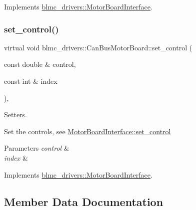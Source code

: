 Implements \hyperlink{classblmc__drivers_1_1MotorBoardInterface_a86b4ff810ca652d6761090ceaff65621}{blmc\+\_\+drivers\+::\+Motor\+Board\+Interface}.

\mbox{\label{classblmc__drivers_1_1CanBusMotorBoard_a8dbd787fcfc25d68d5443e2f0bf21f64}} 
\subsubsection{\texorpdfstring{set\+\_\+control()}{set\_control()}}
{\footnotesize\ttfamily virtual void blmc\+\_\+drivers\+::\+Can\+Bus\+Motor\+Board\+::set\+\_\+control (\begin{DoxyParamCaption}\item[{const double \&}]{control,  }\item[{const int \&}]{index }\end{DoxyParamCaption})\hspace{0.3cm}{\ttfamily [inline]}, {\ttfamily [virtual]}}



Setters. 

Set the controls, see \hyperlink{classblmc__drivers_1_1MotorBoardInterface_a3ace57ba3e09b9b3120d09303ff39a61}{Motor\+Board\+Interface\+::set\+\_\+control}


\begin{DoxyParams}{Parameters}
{\em control} & \\
\hline
{\em index} & \\
\hline
\end{DoxyParams}


Implements \hyperlink{classblmc__drivers_1_1MotorBoardInterface_a3ace57ba3e09b9b3120d09303ff39a61}{blmc\+\_\+drivers\+::\+Motor\+Board\+Interface}.



\subsection{Member Data Documentation}
\mbox{\label{classblmc__drivers_1_1CanBusMotorBoard_a65cfba005239247df1ea26795ff14a3f}} 
